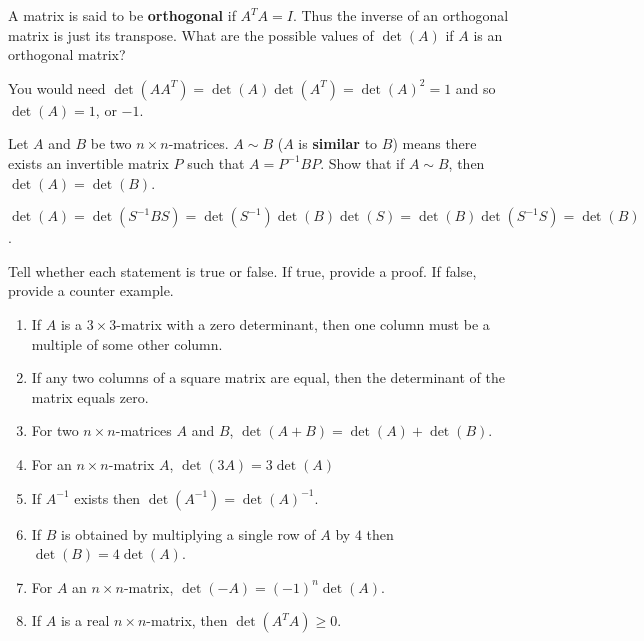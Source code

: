 \begin{enumialphparenastyle}
\begin{ex} \label{exer-orthogonal}A matrix is said to be \textbf{orthogonal}  if 
$A^{T}A=I$. Thus the inverse of an orthogonal matrix is just its transpose.
What are the possible values of $\det (A) $ if $A$ is an
orthogonal matrix? 
\begin{sol}
You would need $\det (AA^{T}) =\det
(A) \det (A^{T}) =\det (A) ^{2}=1$ and
so $\det (A) =1$, or $-1$.
\end{sol}
\end{ex}

\begin{ex} Let $A$ and $B$ be two $n\times n$-matrices. $A\sim B$
($A$ is \textbf{similar} to $B$) means there exists an invertible matrix $P$
such that $A=P^{-1}BP$. Show that if $A\sim B$, then 
$\det (A) =\det (B)$. 
\begin{sol}
$\det (A) =\det
(S^{-1}BS) =\det (S^{-1}) \det (B) \det
(S) =\det (B) \det (S^{-1}S) =\det
(B)$.
\end{sol}
\end{ex}

\begin{ex} Tell whether each statement is true or false. If true, provide a proof. If false, provide a counter example. 
\begin{enumerate}
\item If $A$ is a $3\times 3$-matrix with a zero determinant, then one
column must be a multiple of some other column.

\item If any two columns of a square matrix are equal, then the determinant
of the matrix equals zero.

\item For two $n\times n$-matrices $A$ and $B$, $\det (A+B)
=\det (A) +\det (B)$.

\item For an $n\times n$-matrix $A$, $\det (3A) =3\det (
A) $

\item If $A^{-1}$ exists then $\det (A^{-1}) =\det (
A) ^{-1}$.

\item If $B$ is obtained by multiplying a single row of $A$ by $4$ then $%
\det (B) =4\det (A)$.

\item For $A$ an $n\times n$-matrix, $\det (-A) =(
-1) ^{n}\det (A)$.

\item If $A$ is a real $n\times n$-matrix, then $\det (A^{T}A)
\geq 0$.


\end{enumerate}
\end{ex}
\end{enumialphparenastyle}
